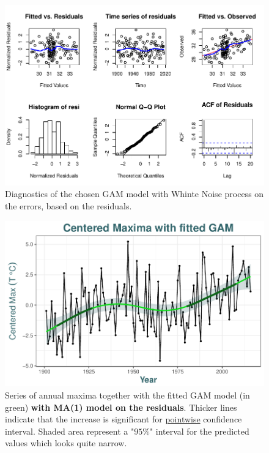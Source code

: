 \begin{figure}[!htb]
\centering	\includegraphics[width=.85\linewidth]{diagnogam.pdf}\caption{Diagnostics of the chosen GAM model with Whinte Noise process on the errors, based on the residuals. }\label{fig:diagnogam}
\end{figure}


\begin{figure}[!htb]
\centering	\includegraphics[width=.7\linewidth]{max_gam.pdf}\caption{Series of annual maxima together with the fitted GAM model (in green) \textbf{with MA(1) model on the residuals}. Thicker lines indicate that the increase is significant for \underline{pointwise} confidence interval. Shaded area represent a "$95\%$" interval for the predicted values which looks quite narrow. }\label{fig:center_gam}
\end{figure}






